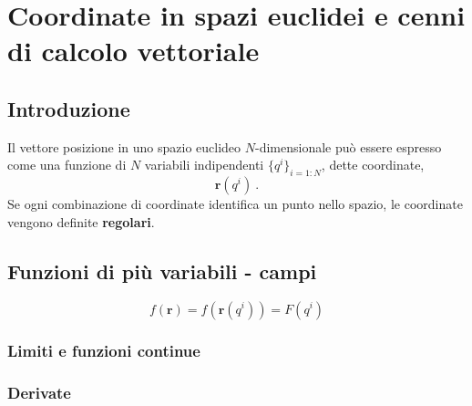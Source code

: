 \chapter{Coordinate in spazi euclidei e cenni di calcolo vettoriale}

\section{Introduzione}
\begin{definition}
\end{definition}

\begin{definition}[Coordinate] Il vettore posizione in uno spazio euclideo $N$-dimensionale può essere espresso come una funzione di $N$ variabili indipendenti $\{ q^i \}_{i=1:N}$, dette coordinate,
    \begin{equation}
        \mathbf{r}(q^i) \ .
    \end{equation}
    Se ogni combinazione di coordinate identifica un punto nello spazio, le coordinate vengono definite \textbf{regolari}.
\end{definition}
\begin{example}
\end{example}
\begin{example}
\end{example}
\begin{example}
\end{example}

\section{Funzioni di più variabili - campi}
\begin{equation}
    f(\mathbf{r}) = f(\mathbf{r}(q^i)) = F(q^i)
\end{equation}

\subsection{Limiti e funzioni continue}

\subsection{Derivate}
\begin{definition}
\end{definition}


